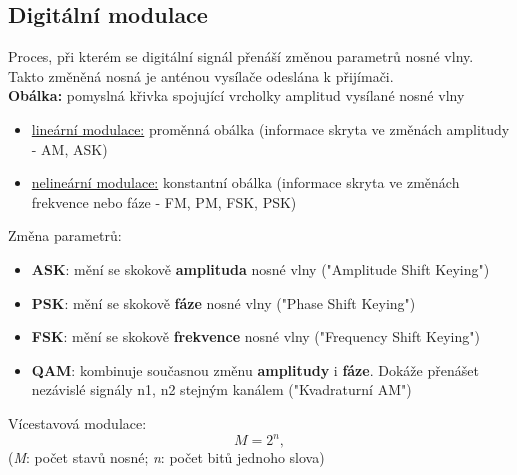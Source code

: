 \subsection{Digitální modulace}
Proces, při kterém se digitální signál přenáší změnou parametrů nosné vlny.\\
Takto změněná nosná je anténou vysílače odeslána k přijímači.\\
\textbf{Obálka:} pomyslná křivka spojující vrcholky amplitud vysílané nosné vlny
\begin{itemize}
	\item \underline{lineární modulace:} proměnná obálka (informace skryta ve změnách amplitudy - AM, ASK)
	\item \underline{nelineární modulace:} konstantní obálka (informace skryta ve změnách frekvence nebo fáze - FM, PM, FSK, PSK)
\end{itemize}
Změna parametrů:
\begin{itemize}
	\item \textbf{ASK}: mění se skokově \textbf{amplituda} nosné vlny ("Amplitude Shift Keying")
	\item \textbf{PSK}: mění se skokově \textbf{fáze} nosné vlny ("Phase Shift Keying")
	\item \textbf{FSK}: mění se skokově \textbf{frekvence} nosné vlny ("Frequency Shift Keying")
	\item \textbf{QAM}: kombinuje současnou změnu \textbf{amplitudy} i \textbf{fáze}. Dokáže přenášet nezávislé signály n1, n2 stejným kanálem ("Kvadraturní AM")\\
\end{itemize}
Vícestavová modulace: 
\begin{equation}
	{M = 2^n},
\end{equation}
(\textit{M}: počet stavů nosné; \textit{n}: počet bitů jednoho slova)\\

